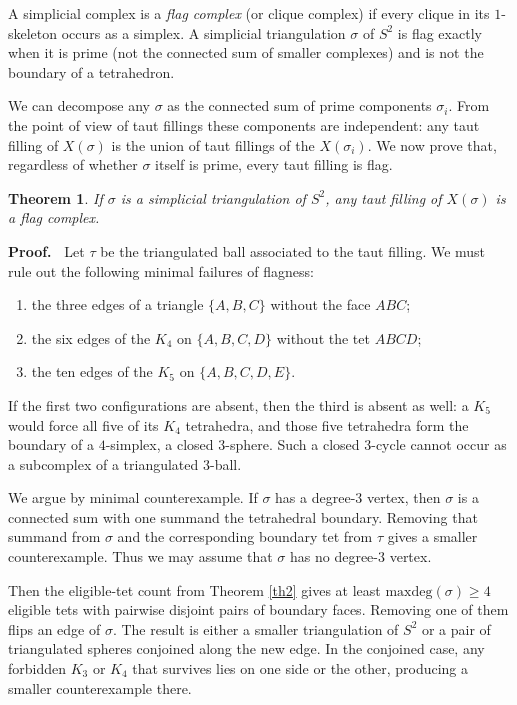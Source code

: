 \documentclass[12pt]{article}
\newtheorem{theorem}{Theorem}
\newcommand{\proofstart}{{\noindent \bf Proof.\ }}
\newcommand{\kw}{\mathrm}
\newcommand{\maxdeg}{\kw{maxdeg}}
\begin{document}
A simplicial complex is a \emph{flag complex}
(or clique complex) if every clique in its $1$-skeleton occurs as a
simplex.
A simplicial triangulation $\sigma$ of $S^2$
is flag exactly when it is prime
(not the connected sum of smaller complexes)
and is not the boundary of a tetrahedron.

We can decompose any $\sigma$ as the connected sum of
prime components $\sigma_i$.
From the point of view of taut fillings these components are independent:
any taut filling of $X(\sigma)$ is the union of taut fillings of the
$X(\sigma_i)$.
We now prove that, regardless of whether $\sigma$ itself is prime,
every taut filling is flag.

\begin{theorem}
If $\sigma$ is a simplicial triangulation of $S^2$,
any taut filling of $X(\sigma)$ is a flag complex.
\end{theorem}

\proofstart
Let $\tau$ be the triangulated ball associated to the taut filling.
We must rule out the following minimal failures of flagness:
\begin{enumerate}
\item
the three edges of a triangle $\{A,B,C\}$ without the face $ABC$;
\item
the six edges of the $K_4$ on $\{A,B,C,D\}$ without the tet $ABCD$;
\item
the ten edges of the $K_5$ on $\{A,B,C,D,E\}$.
\end{enumerate}

If the first two configurations are absent, then the third is absent as
well: a $K_5$ would force all five of its $K_4$ tetrahedra, and those
five tetrahedra form the boundary of a $4$-simplex, a closed $3$-sphere.
Such a closed $3$-cycle cannot occur as a subcomplex of a triangulated
$3$-ball.

We argue by minimal counterexample.
If $\sigma$ has a degree-$3$ vertex, then $\sigma$ is a connected sum
with one summand the tetrahedral boundary.
Removing that summand from $\sigma$ and the corresponding boundary tet
from $\tau$ gives a smaller counterexample.
Thus we may assume that $\sigma$ has no degree-$3$ vertex.

Then the eligible-tet count from Theorem \ref{th2} gives at least
$\maxdeg(\sigma)\geq 4$ eligible tets with pairwise disjoint pairs of
boundary faces.
Removing one of them flips an edge of $\sigma$.
The result is either a smaller triangulation of $S^2$ or a pair of
triangulated spheres conjoined along the new edge.
In the conjoined case, any forbidden $K_3$ or $K_4$ that survives lies
on one side or the other, producing a smaller counterexample there.
\end{document}
